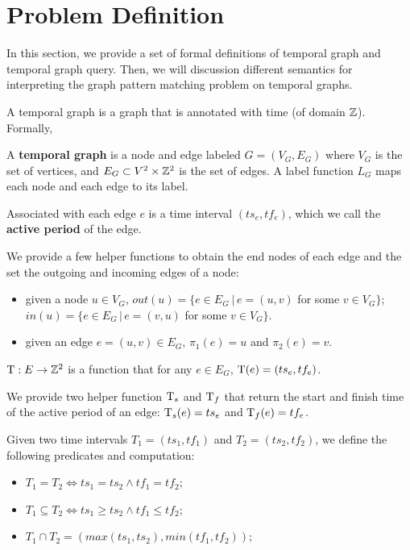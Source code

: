 \section{Problem Definition}
\label{sec:definitions}

In this section, we provide a set of formal definitions of temporal graph and
temporal graph query. Then, we will discussion different semantics for
interpreting the graph pattern matching problem on temporal graphs.

A temporal graph is a graph that is annotated with time (of domain
$\mathbb{Z}$). Formally,

\begin{defn}
  A \textbf{temporal graph} is a node and edge labeled $G = (V_G,E_G)$ where
  $V_G$ is the set of vertices, and $E_G \subset V^2\times \mathbb{Z}^2$ is the set of
  edges. A label function $L_G$ maps each node and each edge to its label.
  
  Associated with each edge $e$ is  a time interval $(ts_e, tf_e)$, which 
  we call the {\bf active period} of the edge. 
\end{defn}

  We provide a few helper functions to obtain the end nodes of each edge and the
  set the outgoing and incoming edges of a node:
  \begin{itemize}
  	\item given a node $u \in V_G$, $out(u) = \{e \in E_G \ | \,e = (u,v)$
          for some $v \in V_G\}$; $in(u) = \{e \in E_G \,|\, e = (v,u)$ for some
          $v \in V_G\}$.
	\item given an edge $e = (u,v) \in E_G$, $\pi_1(e) = u$ and $\pi_2(e) =
          v$.
  \end{itemize}
  
   $\text{T} : E \to \mathbb{Z}^2$ is a function that for any $e \in E_G$, $\text{T}(e) = (ts_e,
  tf_e)$.

  We provide two helper function $\text{T}_s$ and $\text{T}_f$ that return the start and
  finish time of the active period of an edge: $\text{T}_s(e) = ts_e$ and $\text{T}_f(e) =
  tf_e$.
  
  Given two time intervals $T_1=(ts_1, tf_1)$ and $T_2 =(ts_2, tf_2)$, we define
  the following predicates and computation:
  \begin{itemize}
  	\item  $T_1 = T_2 \Leftrightarrow ts_1 = ts_2 \wedge tf_1 = tf_2$;
	\item $T_1 \subseteq T_2 \Leftrightarrow ts_1 \ge ts_2 \wedge tf_1 \le tf_2$;  
 	\item $T_1 \cap T_2 = (max(ts_1, ts_2), min(tf_1, tf_2))$;
\end{itemize}

